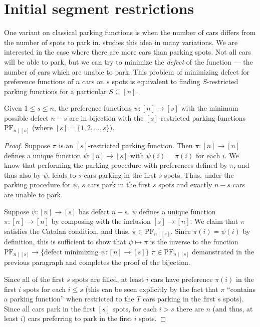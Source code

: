 \documentclass[12pt]{article}
\begin{document}
\section{Initial segment restrictions}
 
One variant on classical parking functions is when the number of cars differs from the number of spots to park in. \cite{cameron-johannsen-prellberg-schweitzer-2008} studies this idea in many variations. We are interested in the case where there are more cars than parking spots. Not all cars will be able to park, but we can try to minimize the \textit{defect} of the function --- the number of cars which are unable to park. This problem of minimizing defect for preference functions of $n$ cars on $s$ spots is equivalent to finding $S$-restricted parking functions for a particular $S \subseteq [n]$.

\begin{theorem}
    Given $1\le s\le n$, the preference functions $\psi : [n] \to [s]$ with the minimum possible defect $n - s$ are in bijection with the $[s]$-restricted parking functions $\mathrm{PF}_{n \mid [s]}$ (where $[s] = \{ 1, 2, \dots, s \}$).
\end{theorem}

\begin{proof}
	Suppose $\pi$ is an $[s]$-restricted parking function. Then $\pi : [n] \to [n]$ defines a unique function $\psi : [n] \to [s]$ with $\psi(i) = \pi(i)$ for each $i$. We know that performing the parking procedure with preferences defined by $\pi$, and thus also by $\psi$, leads to $s$ cars parking in the first $s$ spots. Thus, under the parking procedure for $\psi$, $s$ cars park in the first $s$ spots and exactly $n - s$ cars are unable to park.

	Suppose $\psi : [n] \to [s]$ has defect $n - s$. $\psi$ defines a unique function $\pi : [n] \to [n]$ by composing with the inclusion $[s] \to [n]$. We claim that $\pi$ satisfies the Catalan condition, and thus, $\pi \in \mathrm{PF}_{n \mid [s]}$. Since $\pi(i) = \psi(i)$ by definition, this is sufficient to show that $\psi \mapsto \pi$ is the inverse to the function $\mathrm{PF}_{n \mid [s]} \to \{ \text{defect minimizing } \psi : [n] \to [s] \}$ $\pi \in \mathrm{PF}_{n \mid [s]}$ demonstrated in the previous paragraph and completes the proof of the bijection.

	Since all of the first $s$ spots are filled, at least $i$ cars have preference $\pi(i)$ in the first $i$ spots for each $i \le s$ (this can be seen explicitly by the fact that $\pi$ ``contains a parking function'' when restricted to the $T$ cars parking in the first $s$ spots). Since all cars park in the first $[s]$ spots, for each $i > s$ there are $n$ (and thus, at least $i$) cars preferring to park in the first $i$ spots.
\end{proof}
\end{document}
